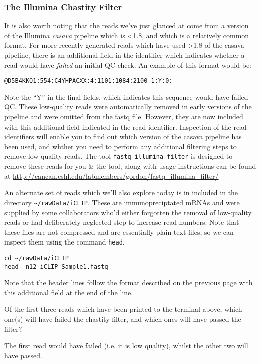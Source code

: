 \subsubsection{The Illumina Chastity Filter}
\begin{information}
It is also worth noting that the reads we've just glanced at come from a version of the Illumina \textit{casava} pipeline which is \textless 1.8, and which is a relatively common format.
For more recently generated reads which have used \textgreater 1.8 of the casava pipeline, there is an additional field in the identifier which indicates whether a read would have \textit{failed} an initial QC check. 
An example of this format would be:
\begin{lstlisting}
@D5B4KKQ1:554:C4YHPACXX:4:1101:1084:2100 1:Y:0:
\end{lstlisting}
Note the ``Y'' in the final fields, which indicates this sequence would have failed QC.
These low-quality reads were automatically removed in early versions of the pipeline and were omitted from the fastq file.
However, they are now included with this additional field indicated in the read identifier.
Inspection of the read identifiers will enable you to find out which version of the casava pipeline has been used, and whther you need to perform any additional filtering steps to remove low quality reads. 
The tool \texttt{fastq_illumina_filter} is designed to remove these reads for you \& the tool, along with usage instructions can be found at \url{http://cancan.cshl.edu/labmembers/gordon/fastq_illumina_filter/}\\
\end{information}

\begin{steps}
An alternate set of reads which we'll also explore today is in included in the directory \texttt{\~{}/rawData/iCLIP}.
These are immunopreciptated mRNAs and were supplied by some collaborators who'd either forgotten the removal of low-quality reads or had deliberately neglected step to increase read numbers.
Note that these files are not compressed and are essentially plain text files, so we can inspect them using the command \texttt{head}.\\
\end{steps}

\begin{lstlisting}
cd ~/rawData/iCLIP
head -n12 iCLIP_Sample1.fastq
\end{lstlisting}

Note that the header lines follow the format described on the previous page with this additional field at the end of the line.
\begin{questions}
Of the first three reads which have been printed to the terminal above, which one(s) will have failed the chastity filter, and which ones will have passed the filter?\\
\begin{answer}
The first read would have failed (i.e. it is low quality), whilst the other two will have passed.
\end{answer}
\end{questions}

